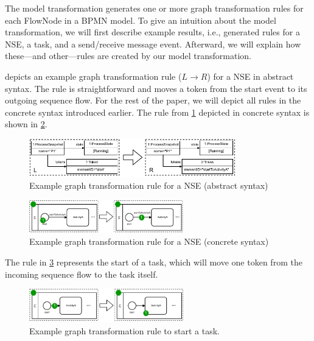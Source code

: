 \documentclass[submission, copyright, creativecommons]{eptcs}
\begin{document}
The model transformation generates one or more graph transformation rules for each \textsf{FlowNode} in a BPMN model.
To give an intuition about the model transformation, we will first describe example results, i.e., generated rules for a NSE, a task, and a send/receive message event.
Afterward, we will explain how these---and other---rules are created by our model transformation.

 depicts an example graph transformation rule ($L \to R$) for a NSE in abstract syntax.
The rule is straightforward and moves a token from the start event to its outgoing sequence flow.
For the rest of the paper, we will depict all rules in the concrete syntax introduced earlier.
The rule from \cref{fig:gtRuleAbstract} depicted in concrete syntax is shown in \cref{fig:gtRuleConcrete}.

\begin{figure}[h]
    \centering
  \includegraphics[width=0.8\textwidth]{images/rule_abstract.pdf}
  \caption{Example graph transformation rule for a NSE (abstract syntax)}  \label{fig:gtRuleAbstract}
\end{figure}

\begin{figure}[h]
    \centering
  \includegraphics[width=0.6\textwidth]{images/rule_concrete.pdf}
  \caption{Example graph transformation rule for a NSE (concrete syntax)}
  \label{fig:gtRuleConcrete}
\end{figure}

The rule in \cref{fig:taskRules} represents the start of a task, which will move one token from the incoming sequence flow to the task itself.

\begin{figure}[h]
    \centering
    \includegraphics[width=0.6\textwidth]{images/bpmn_semantics-rules.pdf}
    \caption{Example graph transformation rule to start a task.}
    \label{fig:taskRules}
\end{figure}
\end{document}
